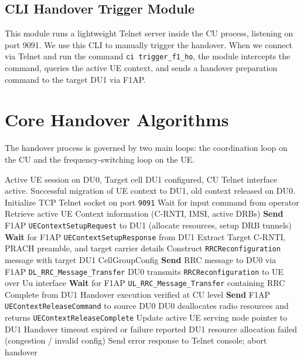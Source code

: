 \subsection{CLI Handover Trigger Module}
This module runs a lightweight Telnet server inside the CU process, listening on port 9091. We use this CLI to manually trigger the handover. When we connect via Telnet and run the command \texttt{ci trigger\_f1\_ho}, the module intercepts the command, queries the active UE context, and sends a handover preparation command to the target DU1 via F1AP.

\section{Core Handover Algorithms}
\justify
The handover process is governed by two main loops: the coordination loop on the CU and the frequency-switching loop on the UE.

\begin{algorithm}[H]
\caption{CU Handover Coordination Loop} \label{alg:cu_ho}
\begin{algorithmic}[1]
\Require Active UE session on DU0, Target cell DU1 configured, CU Telnet interface active.
\Ensure Successful migration of UE context to DU1, old context released on DU0.
\State Initialize TCP Telnet socket on port \texttt{9091}
    \State Wait for input command from operator
        \State Retrieve active UE Context information (C-RNTI, IMSI, active DRBs)
        \State \textbf{Send} F1AP \texttt{UEContextSetupRequest} to DU1 (allocate resources, setup DRB tunnels)
        \State \textbf{Wait} for F1AP \texttt{UEContextSetupResponse} from DU1
            \State Extract Target C-RNTI, PRACH preamble, and target carrier details
            \State Construct \texttt{RRCReconfiguration} message with target DU1 CellGroupConfig
            \State \textbf{Send} RRC message to DU0 via F1AP \texttt{DL\_RRC\_Message\_Transfer}
            \State DU0 transmits \texttt{RRCReconfiguration} to UE over Uu interface
            \State \textbf{Wait} for F1AP \texttt{UL\_RRC\_Message\_Transfer} containing RRC Complete from DU1
                \State Handover execution verified at CU level
                \State \textbf{Send} F1AP \texttt{UEContextReleaseCommand} to source DU0
                \State DU0 deallocates radio resources and returns \texttt{UEContextReleaseComplete}
                \State Update active UE serving node pointer to DU1
                \State {}
            \Else
                \State Handover timeout expired or failure reported
                \State {}
            \EndIf
        \Else
            \State DU1 resource allocation failed (congestion / invalid config)
            \State Send error response to Telnet console; abort handover
            \State {}
        \EndIf
    \EndIf
\EndWhile
\end{algorithmic}
\end{algorithm}

